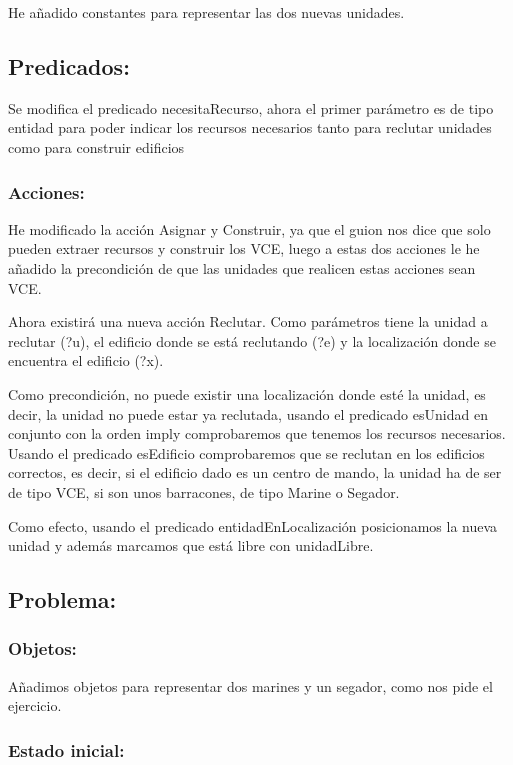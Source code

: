 \documentclass[10pt, spanish]{article}
\begin{document}
He añadido constantes para representar las dos nuevas unidades.

\subsection{Predicados:}

Se modifica el predicado necesitaRecurso, ahora el primer parámetro es de tipo entidad para poder indicar los recursos necesarios tanto para reclutar unidades como para construir edificios

\subsubsection{Acciones:}

He modificado la acción Asignar y Construir, ya que el guion nos dice que solo pueden extraer recursos y construir los VCE, luego a estas dos acciones le he añadido la precondición de que las unidades que realicen estas acciones sean VCE.


Ahora existirá una nueva acción Reclutar. Como parámetros tiene la unidad a reclutar (?u), el edificio donde se está reclutando (?e) y la localización donde se encuentra el edificio (?x).

Como precondición, no puede existir una localización donde esté la unidad, es decir, la unidad no puede estar ya reclutada, usando el predicado esUnidad en conjunto con la orden imply comprobaremos que tenemos los recursos necesarios. Usando el predicado esEdificio comprobaremos que se reclutan en los edificios correctos, es decir, si el edificio dado es un centro de mando, la unidad ha de ser de tipo VCE, si son unos barracones, de tipo Marine o Segador.

Como efecto, usando el predicado entidadEnLocalización posicionamos la nueva unidad y además marcamos que está libre con unidadLibre.


\subsection{Problema:}

\subsubsection{Objetos:}

Añadimos objetos para representar dos marines y un segador, como nos pide el ejercicio.

\subsubsection{Estado inicial:}
\end{document}
